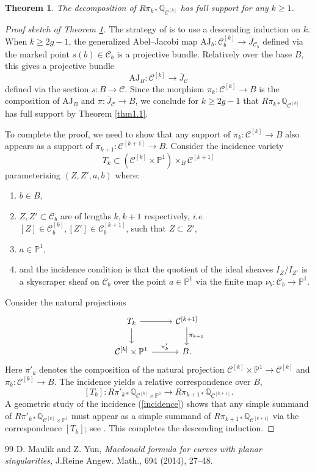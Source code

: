 \documentclass[10pt,a4paper]{amsart}
\newtheorem{thm}{Theorem}
\newcommand{\BP}{{\mathbb{P}}}
\newcommand{\BQ}{{\mathbb{Q}}}
\newcommand{\CC}{{\mathcal C}}
\begin{document}
\begin{thm}\label{thm3.2}
    The decomposition of $R\pi_{k*} \BQ_{\CC^{[k]}}$ has full support for any $k\geq 1$.
\end{thm}

\begin{proof}[Proof sketch of Theorem \ref{thm3.2}]
The strategy of \cite{MY} is to use a descending induction on $k$. When $k \geq 2g-1$, the generalized Abel--Jacobi map $\mathrm{AJ}_b: \CC_b^{[k]} \to \overline{J}_{\CC_b}$ defined via the marked point $s(b) \in \CC_b$ is a projective bundle. Relatively over the base $B$, this gives a projective bundle
\[
\mathrm{AJ}_B: \CC^{[k]} \to \overline{J}_\CC
\]
defined via the section $s: B \to \CC $. Since the morphism $\pi_k:\CC^{[k]} \to B$ is the composition of $\mathrm{AJ}_B$ and $\pi: \overline{J}_\CC \to B$, we conclude for $k\geq 2g-1$ that $R\pi_{k*} \BQ_{\CC^{[k]}}$ has full support by Theorem \ref{thm1.1}.

To complete the proof, we need to show that any support of $\pi_{k}: \CC^{[k]} \to B$ also appears as a support of $\pi_{k+1}: \CC^{[k+1]} \to B$. Consider the incidence variety
\[
T_k \subset \left( \CC^{[k]} \times \BP^1 \right) \times_B \CC^{[k+1]}
\]
parameterizing $(Z, Z',a,b)$ where:
\begin{enumerate}
    \item[$\bullet$]  $b \in B$,
    \item[$\bullet$] $Z,Z' \subset \CC_b$ are of lengths $k, k+1$ respectively, \emph{i.e.} $[Z] \in \CC_b^{[k]}, [Z'] \in \CC_b^{[k+1]}$, such that $Z\subset Z'$,
    \item[$\bullet$] $a \in \BP^1$, 
    \item[$\bullet$] and the incidence condition is that the quotient of the ideal sheaves $I_{Z}/I_{Z'}$ is a skyscraper sheaf on $\CC_b$ over the point $a \in \BP^1$ via the finite map $\nu_b: \CC_b \to \BP^1$.
\end{enumerate} 

\medskip

Consider the natural projections
\begin{equation}\label{incidence}
    \begin{tikzcd}
T_k \arrow[r, ""] \arrow[d, ""]
& \CC^{[k+1]} \arrow[d, "\pi_{k+1}"]\\
\CC^{[k]} \times \BP^1 \arrow[r, "\pi'_k"] & B.
\end{tikzcd}
\end{equation}
Here $\pi'_k$ denotes the composition of the natural projection $\CC^{[k]} \times \BP^1 \to \CC^{[k]}$ and $\pi_k: \CC^{[k]} \to B$.
The incidence yields a relative correspondence over $B$,
\[
[T_k]: R\pi'_{k*} \BQ_{\CC^{[k]} \times \BP^1} \to R\pi_{k+1*} \BQ_{\CC^{[k+1]}}.
\]
A geometric study of the incidence (\ref{incidence}) shows that any simple summand of $R\pi'_{k*} \BQ_{\CC^{[k]} \times \BP^1}$ must appear as a simple summand of $ R\pi_{k+1*} \BQ_{\CC^{[k+1]}}$ via the correspondence $[T_k]$; see \cite[Page 10]{MY}. This completes the descending induction.
\end{proof}

\begin{thebibliography}{99}
 D. Maulik and Z. Yun, {\em Macdonald formula for curves with planar singularities,} J.Reine Angew. Math., 694 (2014), 27--48. %
\end{thebibliography}
\end{document}
